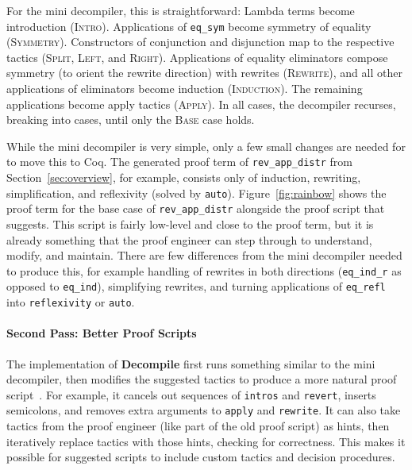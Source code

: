 For the mini decompiler, this is straightforward: Lambda terms become introduction (\textsc{Intro}).
Applications of \lstinline{eq_sym} become symmetry of equality (\textsc{Symmetry}).
Constructors of conjunction and disjunction map to the respective tactics (\textsc{Split}, \textsc{Left}, and \textsc{Right}).
Applications of equality eliminators compose symmetry (to orient the rewrite direction) with rewrites (\textsc{Rewrite}),
and all other applications of eliminators become induction (\textsc{Induction}).
The remaining applications become apply tactics (\textsc{Apply}).
In all cases, the decompiler recurses, breaking into cases, until only the \textsc{Base}
case holds. %

While the mini decompiler is very simple, only a few small changes are needed for 
to move this to Coq.
The generated proof term of \lstinline{rev_app_distr} from Section~\ref{sec:overview},
for example, consists only of induction, rewriting, simplification, and reflexivity (solved by \lstinline{auto}).
Figure~\ref{fig:rainbow} shows the proof term for the base case of \lstinline{rev_app_distr} 
alongside the proof script that \toolnamec suggests.
This script is fairly low-level and close to the proof term, but it is already something that the proof engineer
can step through to understand, modify, and maintain.
There are few differences from the mini decompiler needed to produce this,
for example handling of rewrites in both directions (\lstinline{eq_ind_r} as opposed to \lstinline{eq_ind}),
simplifying rewrites,
and turning applications of \lstinline{eq_refl} into \lstinline{reflexivity} or \lstinline{auto}.

\paragraph{Second Pass: Better Proof Scripts}
The implementation of \textbf{Decompile} first runs something similar to the mini decompiler, then modifies the suggested tactics to produce a more natural proof script~\href{https://github.com/uwplse/coq-plugin-lib/tree/9ef05815c261de9c99b604c6b581ba1c4fbc1a46/src/coq/decompiler/decompiler.ml}{}. %
For example, it cancels out sequences of \lstinline{intros} and \lstinline{revert},
inserts semicolons, and removes extra arguments to \lstinline{apply} and \lstinline{rewrite}. %
It can also take tactics from the proof engineer (like part of the old proof script) as hints,
then iteratively replace tactics with those hints, checking for correctness.
This makes it possible for suggested scripts to include custom tactics and decision procedures.

